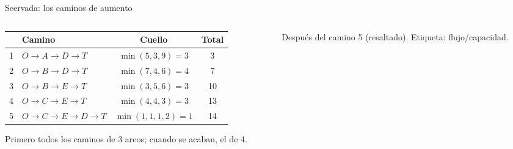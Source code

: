 \documentclass[aspectratio=169]{beamer}
\newcommand{\ar}[4][arco]{\draw[#1] (#2) to node[etq, lbl] {#4} (#3);}
\newcommand{\nodosSeervada}{%
  \node[fuente]   (O) at (0,-2)     {O};
  \node[nodo]     (A) at (1.5,-0.6) {A};
  \node[nodo]     (B) at (2,-2)     {B};
  \node[nodo]     (C) at (1.5,-3.4) {C};
  \node[nodo]     (D) at (3.6,-0.9) {D};
  \node[nodo]     (E) at (3.6,-3.1) {E};
  \node[sumidero] (T) at (5,-2)     {T};}
\begin{document}
\begin{frame}{Seervada: los caminos de aumento}
  \begin{columns}[c]
    \begin{column}{0.53\textwidth}
      \footnotesize
      \setlength{\tabcolsep}{2.5pt}
      \begin{tabular}{clcc}
        \toprule
        & \textbf{Camino} & \textbf{Cuello} & \textbf{Total} \\
        \midrule
        1 & $O\to A\to D\to T$ & $\min(5,3,9) = 3$ & 3 \\
        2 & $O\to B\to D\to T$ & $\min(7,4,6) = 4$ & 7 \\
        3 & $O\to B\to E\to T$ & $\min(3,5,6) = 3$ & 10 \\
        4 & $O\to C\to E\to T$ & $\min(4,4,3) = 3$ & 13 \\
        5 & $O\to C\to E\to D\to T$ & $\min(1,1,1,2) = 1$ & 14 \\
        \bottomrule
      \end{tabular}

      \medskip
      Primero todos los caminos de 3 arcos; cuando se acaban, el de 4.
    \end{column}
    \begin{column}{0.45\textwidth}
      \centering

      \scriptsize Después del camino 5 (resaltado). Etiqueta: flujo/capacidad.
    \end{column}
  \end{columns}
\end{frame}
\end{document}
